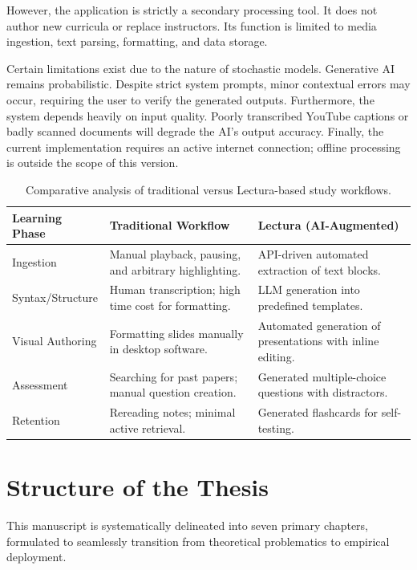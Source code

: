 However, the application is strictly a secondary processing tool. It does not author new curricula or replace instructors. Its function is limited to media ingestion, text parsing, formatting, and data storage. 

Certain limitations exist due to the nature of stochastic models. Generative AI remains probabilistic. Despite strict system prompts, minor contextual errors may occur, requiring the user to verify the generated outputs. Furthermore, the system depends heavily on input quality. Poorly transcribed YouTube captions or badly scanned documents will degrade the AI's output accuracy. Finally, the current implementation requires an active internet connection; offline processing is outside the scope of this version.

\begin{table}[htbp]
\centering
\begin{tabular}{|l|p{5cm}|p{5cm}|}
\hline
\textbf{Learning Phase} & \textbf{Traditional Workflow} & \textbf{Lectura (AI-Augmented)} \\ \hline
Ingestion & Manual playback, pausing, and arbitrary highlighting. & API-driven automated extraction of text blocks. \\ \hline
Syntax/Structure & Human transcription; high time cost for formatting. & LLM generation into predefined templates. \\ \hline
Visual Authoring & Formatting slides manually in desktop software. & Automated generation of presentations with inline editing. \\ \hline
Assessment & Searching for past papers; manual question creation. & Generated multiple-choice questions with distractors. \\ \hline
Retention & Rereading notes; minimal active retrieval. & Generated flashcards for self-testing. \\ \hline
\end{tabular}
\vspace{6pt}
\caption{Comparative analysis of traditional versus Lectura-based study workflows.}
\label{tab:workflow_comparison}
\end{table}

\section{Structure of the Thesis}
This manuscript is systematically delineated into seven primary chapters, formulated to seamlessly transition from theoretical problematics to empirical deployment.

